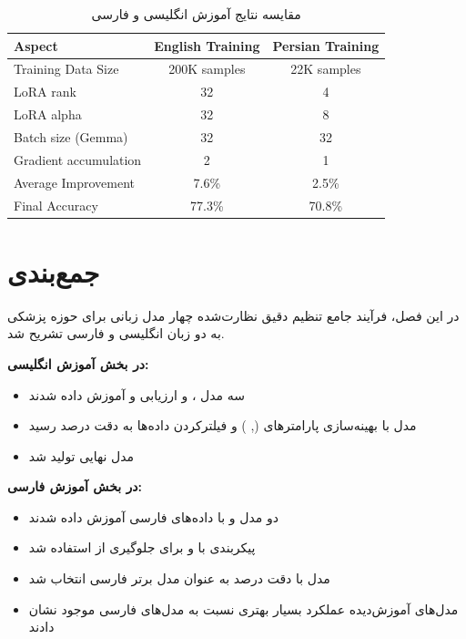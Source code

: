 \documentclass[11pt, a4paper, oneside]{book}
\begin{document}
	\begin{table}[h!]
		\centering
		\caption{مقایسه نتایج آموزش انگلیسی و فارسی}
		\label{tab:english-persian-comparison}
		\begin{latin}
			\begin{tabular}{lcc}
				\hline
				\textbf{Aspect} & \textbf{English Training} & \textbf{Persian Training} \\
				\hline
				Training Data Size & 200K samples & 22K samples \\
				LoRA rank & 32 & 4 \\
				LoRA alpha & 32 & 8 \\
				Batch size (Gemma) & 32 & 32 \\
				Gradient accumulation & 2 & 1 \\
				Average Improvement & 7.6\% & 2.5\% \\
				Final Accuracy & 77.3\% & 70.8\% \\
				\hline
			\end{tabular}
		\end{latin}
	\end{table}

	\section{جمع‌بندی}
	در این فصل، فرآیند جامع تنظیم دقیق نظارت‌شده چهار مدل زبانی برای حوزه پزشکی به دو زبان انگلیسی و فارسی تشریح شد. 

	\textbf{در بخش آموزش انگلیسی:}
	\begin{itemize}
		\item سه مدل ،  و  ارزیابی و آموزش داده شدند
		\item مدل  با بهینه‌سازی پارامترهای  (, ) و فیلترکردن داده‌ها به دقت  درصد رسید
		\item مدل نهایی  تولید شد
	\end{itemize}

	\textbf{در بخش آموزش فارسی:}
	\begin{itemize}
		\item دو مدل  و  با داده‌های فارسی آموزش داده شدند
		\item پیکربندی  با  و  برای جلوگیری از  استفاده شد
		\item مدل  با دقت  درصد به عنوان مدل برتر فارسی انتخاب شد
		\item مدل‌های آموزش‌دیده عملکرد بسیار بهتری نسبت به مدل‌های فارسی موجود نشان دادند
	\end{itemize}
\end{document}
